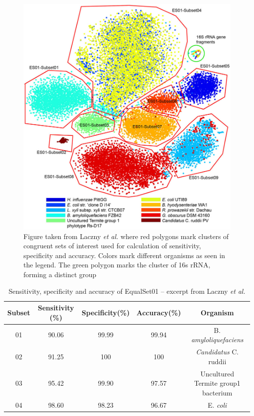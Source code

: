 \documentclass[twocolumn]{bmcart}%
\begin{document}
\begin{figure}[h!]
	\centering
	\includegraphics[width=.98\linewidth]{bilder/clusterData1.jpg}
	\caption{Figure taken from Laczny \textit{et al.} \cite{Laczny2014} where red polygons mark clusters of congruent sets of interest used for calculation of sensitivity, specificity and accuracy. Colors mark different organisms as seen in the legend. The green polygon marks the cluster of 16s rRNA, forming a distinct group}
	\label{img:clusterData1}
\end{figure}
\begin{table}[h]
	\centering
	\caption{Sensitivity, specificity and accuracy of EqualSet01 -- excerpt from Laczny \textit{et al.}\cite{Laczny2014}}
	\begin{tabular}{c|c|c|c|c}
		Subset&Sensitivity (\%)&Specificity(\%)&Accuracy(\%)&Organism\\
		\hline
		01&90.06&99.99&99.94&B. \textit{amyloliquefaciens}\\
		02&91.25&100&100&\textit{Candidatus} C. ruddii\\
		03&95.42&99.90&97.57&Uncultured Termite group1 bacterium\\
		04&98.60&98.23&96.67&E. \textit{coli}
	\end{tabular}
\label{tab:sens-spec-acc1}
\end{table}
\end{document}

